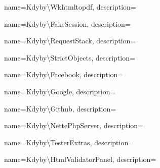  {
  name={Kdy\-by\textbackslash{}Wk\-html\-to\-pdf},
  description={} }

 {
  name={Kdy\-by\textbackslash{}Fa\-ke\-Ses\-si\-on},
  description={} }

 {
  name={Kdy\-by\textbackslash{}Re\-que\-st\-Sta\-ck},
  description={} }

 {
  name={Kdy\-by\textbackslash{}Stri\-ct\-Ob\-je\-ct\-s},
  description={} }

 {
  name={Kdy\-by\textbackslash{}Fa\-ce\-book},
  description={} }

 {
  name={Kdy\-by\textbackslash{}Google},
  description={} }

 {
  name={Kdy\-by\textbackslash{}Git\-hub},
  description={} }

 {
  name={Kdy\-by\textbackslash{}Nette\-Php\-Ser\-ver},
  description={} }

 {
  name={Kdy\-by\textbackslash{}Tes\-ter\-Ex\-tras},
  description={} }

 {
  name={Kdy\-by\textbackslash{}Html\-Va\-li\-da\-tor\-Pa\-nel},
  description={} }
